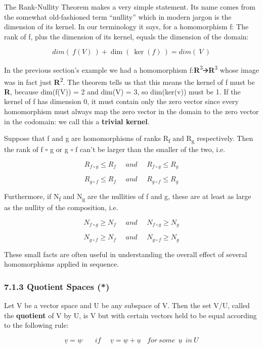 \documentclass[oneside,english]{amsbook}
\numberwithin{section}{chapter}
\theoremstyle{plain}
\theoremstyle{definition}
\begin{document}
The Rank-Nullity Theorem makes a very simple statement. Its name comes
from the somewhat old-fashioned term ``nullity'' which in modern jargon
is the dimension of its kernel. In our terminology it says, for a
homomorphism f: The rank of f, plus the dimension of its kernel, equals
the dimension of the domain:

\[dim(\ f(V)\ ) + \dim\left( \ \ker(f)\  \right) = dim(\ V\ )\]

In the previous section's example we had a homomorphism
f:\textbf{R}\textsuperscript{3}🡪\textbf{R}\textsuperscript{3} whose
image was in fact just \textbf{R}\textsuperscript{2}. The theorem tells
us that this means the kernel of f must be \textbf{R}, because dim(f(V))
= 2 and dim(V) = 3, so dim(ker(v)) must be 1. If the kernel of f has
dimension 0, it must contain only the zero vector since every
homomorphism must always map the zero vector in the domain to the zero
vector in the codomain: we call this a \textbf{trivial kernel}.

Suppose that f and g are homomorphisms of ranks R\textsubscript{f} and
R\textsubscript{g} respectively. Then the rank of f ▫ g or g ▫ f can't
be larger than the smaller of the two, i.e.

\[R_{f \circ g} \leq R_{f}\ \ \ \ \ \ and\ \ \ \ \ \ R_{f \circ g} \leq R_{g}\]

\[R_{g \circ f} \leq R_{f}\ \ \ \ \ \ and\ \ \ \ \ \ R_{g \circ f} \leq R_{g}\]

Furthermore, if N\textsubscript{f} and N\textsubscript{g} are the
nullities of f and g, these are at least as large as the nullity of the
composition, i.e.

\[N_{f \circ g} \geq N_{f}\ \ \ \ \ \ and\ \ \ \ \ \ N_{f \circ g} \geq N_{g}\]

\[N_{g \circ f} \geq N_{f}\ \ \ \ \ \ and\ \ \ \ \ \ N_{g \circ f} \geq N_{g}\]

These small facts are often useful in understanding the overall effect
of several homomorphisms applied in sequence.

\subsubsection{7.1.3 Quotient Spaces (*)}\label{quotient-spaces}

Let V be a vector space and U be any subspace of V. Then the set V/U,
called the \textbf{quotient} of V by U, is V but with certain vectors
held to be equal according to the following rule:

\[\underline{v} = \underline{w}\ \ \ \ \ \ \ \ if\ \ \ \ \ \ \underline{v} = \underline{w} + \underline{u}\ \ \ \ for\ some\ \ \underline{u}\ \ in\ U\]
\end{document}
